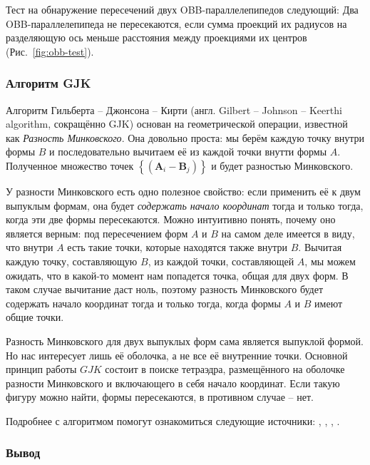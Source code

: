 Тест на обнаружение пересечений двух OBB-параллелепипедов следующий: Два
OBB-параллелепипеда не пересекаются, если сумма проекций их радиусов на
разделяющую ось меньше расстояния между проекциями их центров
(Рис.~\ref{fig:obb-test}).

\subsubsection{Алгоритм GJK}

Алгоритм Гильберта -- Джонсона -- Кирти (англ. Gilbert -- Johnson -- Keerthi
algorithm, сокращённо GJK) основан на геометрической операции, известной как
\textit{Разность Минковского}. Она довольно проста: мы берём каждую точку
внутри формы $B$ и последовательно вычитаем её из каждой точки внутти формы
$A$. Полученное множество точек $\left\{\left( \mathbf{A}_i - \mathbf{B}_j
\right)\right\}$ и будет разностью Минковского. \cite[с.~829]{gea}

У разности Минковского есть одно полезное свойство: если применить её к двум
выпуклым формам, она будет \textit{содержать начало координат} тогда и только
тогда, когда эти две формы пересекаются. Можно интуитивно понять, почему оно
является верным: под пересечением форм $A$ и $B$ на самом деле имеется в виду,
что внутри $A$ есть такие точки, которые находятся также внутри $B$. Вычитая
каждую точку, составляющую $B$, из каждой точки, составляющей $A$, мы можем
ожидать, что в какой-то момент нам попадется точка, общая для двух форм. В
таком случае вычитание даст ноль, поэтому разность Минковского будет содержать
начало координат тогда и только тогда, когда формы $A$ и $B$ имеют общие точки.

Разность Минковского для двух выпуклых форм сама является выпуклой формой. Но
нас интересует лишь её оболочка, а не все её внутренние точки. Основной принцип
работы $GJK$ состоит в поиске тетраэдра, размещённого на оболочке разности
Минковского и включающего в себя начало координат. Если такую фигуру можно
найти, формы пересекаются, в противном случае -- нет. \cite[с.~830]{gea}

Подробнее с алгоритмом помогут ознакомиться следующие источники: \cite{gjksm},
\cite{gjkppt1}, \cite{gjkppt2}, \cite{gjk}.

\subsubsection{Вывод}

